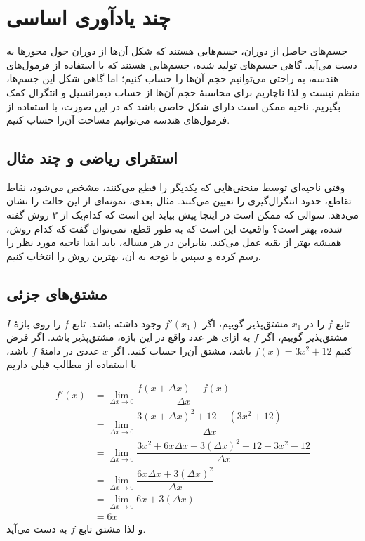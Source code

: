 \chapter{چند یادآوری اساسی}\label{appendix1}
\paragraphfootnotes
جسم‌های حاصل از دوران، جسم‌هایی هستند که شکل آن‌ها از دوران حول محور‌ها به دست می‌آید. گاهی جسم‌های تولید شده، جسم‌هایی هستند که با استفاده از فرمول‌های هندسه، به راحتی می‌توانیم حجم آن‌ها را حساب کنیم؛ اما گاهی شکل این جسم‌ها، منظم نیست و لذا ناچاریم برای محاسبهٔ حجم آن‌ها از حساب دیفرانسیل و انتگرال کمک بگیریم. ناحیه ممکن است  دارای شکل خاصی باشد که در این صورت، با استفاده از فرمول‌های  هندسه می‌توانیم مساحت آن‌را حساب کنیم.
\section{استقرای ریاضی و چند مثال}
وقتی ناحیه‌ای توسط منحنی‌هایی که یکدیگر را قطع می‌کنند، مشخص می‌شود، 
نقاط تقاطع، حدود انتگرال‌گیری را تعیین می‌کنند. مثال بعدی، نمونه‌ای از این 
حالت را نشان می‌دهد. سوالی که ممکن است در اینجا پیش بیاید این است که کدام‌یک از ۳ روش گفته شده، بهتر است؟ واقعیت این است که به طور قطع، نمی‌توان گفت که کدام روش، همیشه بهتر از بقیه عمل می‌کند.
 بنابراین در هر مساله، باید ابتدا
ناحیه مورد نظر را رسم کرده و سپس با توجه به آن، بهترین روش را انتخاب کنیم.

\section{مشتق‌های جزئی}
تابع $f$ را در $x_1$ مشتق‌پذیر گوییم، اگر $f'(x_1)$ وجود داشته باشد.
تابع $f$ را روی بازهٔ $I$ مشتق‌پذیر گوییم، اگر $f$ به ازای هر عدد واقع در این بازه، مشتق‌پذیر باشد.
اگر فرض کنیم  $f(x)=3x^2+12$ باشد، مشتق آن‌را حساب کنید. 
اگر $x$ عددی در دامنهٔ $f$ باشد، با استفاده از مطالب قبلی داریم

\begin{align*}
f'(x)&=\lim_{\Delta x\rightarrow 0}\dfrac{f(x+\Delta x) - f(x)}{\Delta x}\\[2mm]
&=\lim_{\Delta x\rightarrow 0}\dfrac{3(x+\Delta x)^{2}+12 - (3x^2+12)}{\Delta x}\\[2mm]
&=\lim_{\Delta x\rightarrow 0}\dfrac{3x^2+6x\Delta x+3(\Delta x)^{2}+12-3x^2-12}{\Delta x}\\[2mm]
&=\lim_{\Delta x\rightarrow 0}\dfrac{6x\Delta x+3(\Delta x)^{2}}{\Delta x}\\[2mm]
&=\lim_{\Delta x\rightarrow 0}6x+3(\Delta x)\\[2mm]
&=6x
\end{align*}
و لذا مشتق تابع $f$ به دست می‌آید.
